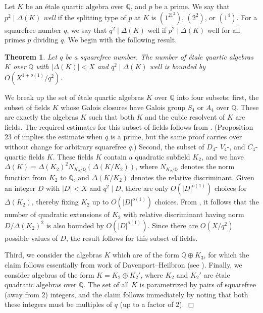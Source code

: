 \documentclass{article}
\def\Q{{\mathbb Q}}
\def\Q{{\mathbb Q}}
\newtheorem{theorem}{Theorem}[section]
\newenvironment{proof}{\noindent {\bf Proof:}}{$\Box$ \vspace{2 ex}}
\begin{document}
Let $K$ be an \'etale quartic algebra over $\Q$, and $p$ be a prime. We say that $p^2\mid\Delta(K)$ {\it well} if the splitting type of $p$ at $K$ is $(1^21^2)$, $(2^2)$, or $(1^4)$. For a squarefree number $q$, we say that $q^2\mid\Delta(K)$ well if $p^2\mid\Delta(K)$ well for all primes $p$ dividing $q$.
We begin with the following result.
\begin{theorem}\label{prop:unif_fields}
Let $q$ be a squarefree number. The number of \'etale quartic algebras $K$ over $\Q$ with $|\Delta(K)|<X$ and $q^2\mid\Delta(K)$ well is bounded by $O(X^{1+o(1)}/q^2)$.
\end{theorem}
\begin{proof}
    We break up the set of \'etale quartic algebras $K$ over $\Q$ into four subsets: first, the subset of fields $K$ whose Galois closures have Galois group $S_4$ or $A_4$ over $\Q$. These are exactly the algebras $K$ such that both $K$ and the cubic resolvent of $K$ are fields. The required estimates for this subset of fields follows from \cite[Proposition 23]{dodqf}. (Proposition 23 of \cite{dodpf} implies the estimate when $q$ is a prime, but the same proof carries over without change for arbitrary squarefree $q$.) Second, the subset of $D_4$- $V_4$-, and $C_4$-quartic fields $K$. These fields $K$ contain a quadratic subfield $K_2$, and we have $\Delta(K)=\Delta(K_2)^2N_{K_2/\Q}(\Delta(K/K_2))$, where $N_{K_2/\Q}$ denotes the norm function from $K_2$ to $\Q$, and $\Delta(K/K_2)$ denotes the relative discriminant. Given an integer $D$ with $|D|<X$ and $q^2\mid D$, there are only $O(|D|^{o(1)})$ choices for $\Delta(K_2)$, thereby fixing $K_2$ up to $O(|D|^{o(1)})$ choices. From \cite[Theorem 1.1]{Cohen_Diaz_Olivier}, it follows that the number of quadratic extensions of $K_2$ with relative discriminant having norm $D/\Delta(K_2)^2$ is also bounded by $O(|D|^{o(1)})$. Since there are $O(X/q^2)$ possible values of $D$, the result follows for this subset of fields. 
    
    Third, we consider the algebras $K$ which are of the form $\Q\oplus K_3$, for which the claim follows essentially from work of Davenport--Heilbron (see \cite[Lemma 2.7]{BBPEE}). Finally, we consider algebras of the form $K=K_2\oplus K_2'$, where $K_2$ and $K_2'$ are \'etale quadratic algebras over $\Q$. The set of all $K$ is parametrized by pairs of squarefree (away from $2$) integers, and the claim follows immediately by noting that both these integers must be multiples of $q$ (up to a factor of $2$).
\end{proof}
\end{document}
